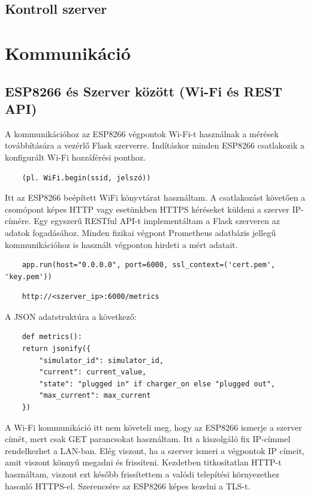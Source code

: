 \subsection{Kontroll szerver}

\section{Kommunikáció}

\subsection{ESP8266 és Szerver között (Wi-Fi és REST API)}

A kommunikációhoz az ESP8266 végpontok Wi-Fi-t használnak a mérések továbbítására a vezérlő Flask szerverre. 
Indításkor minden ESP8266 csatlakozik a konfigurált 
Wi-Fi hozzáférési ponthoz. 
\begin{lstlisting}
    (pl. WiFi.begin(ssid, jelszó))
\end{lstlisting}
Itt az ESP8266 beépített WiFi könyvtárat használtam.
\cite{techtutorialsx:esp8266flask}
A csatlakozást követően a csomópont képes HTTP vagy esetünkben HTTPS kéréseket küldeni a szerver IP-címére. 
Egy egyszerű RESTful API-t implementáltam a Flask szerveren az adatok fogadásához. 
Minden fizikai végpont Prometheus adatbázis jellegű kommunikációhoz is használt végponton hirdeti a mért adatait.
\begin{lstlisting}
    app.run(host="0.0.0.0", port=6000, ssl_context=('cert.pem', 'key.pem'))
\end{lstlisting}

\begin{lstlisting}
    http://<szerver_ip>:6000/metrics
\end{lstlisting} 
A JSON adatstruktúra a következő:

\begin{lstlisting}
    def metrics():
    return jsonify({
        "simulator_id": simulator_id,
        "current": current_value,
        "state": "plugged in" if charger_on else "plugged out",
        "max_current": max_current
    })
\end{lstlisting}

A Wi-Fi kommunikáció itt nem követeli meg, hogy az ESP8266 ismerje a szerver címét, mert csak GET parancsokat
használtam. Itt a kiszolgáló fix IP-címmel rendelkezhet a LAN-ban. Elég viszont, ha a szerver ismeri a végpontok IP címeit,
amit viszont könnyű megadni és frissíteni.
Kezdetben titkosítatlan HTTP-t használtam, viszont ezt később frissítettem a valódi telepítési környezethez hasonló 
HTTPS-el. Szerencsére az ESP8266 képes kezelni a TLS-t.

